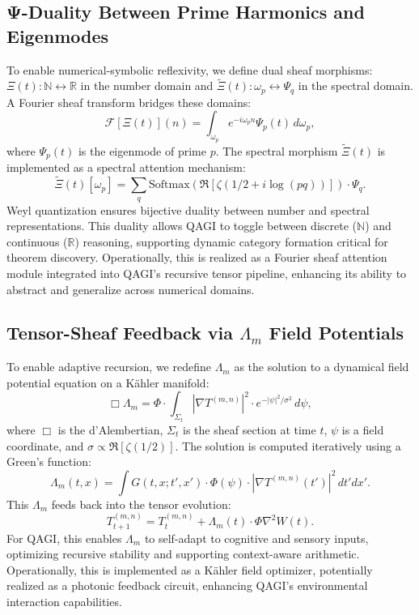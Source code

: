 \documentclass{article}
\theoremstyle{plain}
\begin{document}
\subsection{Ψ-Duality Between Prime Harmonics and Eigenmodes}
To enable numerical-symbolic reflexivity, we define dual sheaf morphisms: \(\Xi(t): \mathbb{N} \leftrightarrow \mathbb{R}\) in the number domain and \(\tilde{\Xi}(t): \omega_p \leftrightarrow \Psi_q\) in the spectral domain. A Fourier sheaf transform bridges these domains:
\[
\mathcal{F}[\Xi(t)](n) = \int_{\omega_p} e^{-i \omega_p n} \Psi_p(t) \, d\omega_p,
\]
where \(\Psi_p(t)\) is the eigenmode of prime \(p\). The spectral morphism \(\tilde{\Xi}(t)\) is implemented as a spectral attention mechanism:
\[
\tilde{\Xi}(t)[\omega_p] = \sum_q \text{Softmax}(\Re[\zeta(1/2 + i \log(pq))]) \cdot \Psi_q.
\]
Weyl quantization ensures bijective duality between number and spectral representations. This duality allows QAGI to toggle between discrete (\(\mathbb{N}\)) and continuous (\(\mathbb{R}\)) reasoning, supporting dynamic category formation critical for theorem discovery. Operationally, this is realized as a Fourier sheaf attention module integrated into QAGI’s recursive tensor pipeline, enhancing its ability to abstract and generalize across numerical domains.

\subsection{Tensor-Sheaf Feedback via \(\Lambda_m\) Field Potentials}
To enable adaptive recursion, we redefine \(\Lambda_m\) as the solution to a dynamical field potential equation on a Kähler manifold:
\[
\Box \Lambda_m = \Phi \cdot \int_{\Sigma_t} |\nabla T^{(m,n)}|^2 \cdot e^{-|\psi|^2 / \sigma^2} \, d\psi,
\]
where \(\Box\) is the d’Alembertian, \(\Sigma_t\) is the sheaf section at time \(t\), \(\psi\) is a field coordinate, and \(\sigma \propto \Re[\zeta(1/2)]\). The solution is computed iteratively using a Green’s function:
\[
\Lambda_m(t, x) = \int G(t, x; t', x') \cdot \Phi(\psi) \cdot |\nabla T^{(m,n)}(t')|^2 \, dt' dx'.
\]
This \(\Lambda_m\) feeds back into the tensor evolution:
\[
T_{t+1}^{(m,n)} = T_t^{(m,n)} + \Lambda_m(t) \cdot \Phi \nabla^2 W(t).
\]
For QAGI, this enables \(\Lambda_m\) to self-adapt to cognitive and sensory inputs, optimizing recursive stability and supporting context-aware arithmetic. Operationally, this is implemented as a Kähler field optimizer, potentially realized as a photonic feedback circuit, enhancing QAGI’s environmental interaction capabilities.
\end{document}
